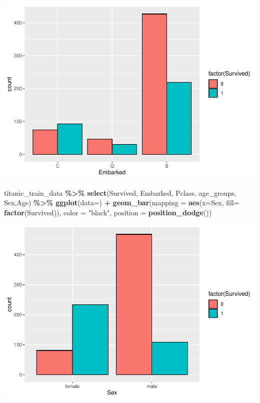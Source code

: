 \documentclass[
]{article}
\newenvironment{Shaded}{\begin{snugshade}}{\end{snugshade}}
\newcommand{\AttributeTok}[1]{\textcolor[rgb]{0.13,0.29,0.53}{#1}}
\newcommand{\FunctionTok}[1]{\textcolor[rgb]{0.13,0.29,0.53}{\textbf{#1}}}
\newcommand{\NormalTok}[1]{#1}
\newcommand{\SpecialCharTok}[1]{\textcolor[rgb]{0.81,0.36,0.00}{\textbf{#1}}}
\newcommand{\StringTok}[1]{\textcolor[rgb]{0.31,0.60,0.02}{#1}}
\begin{document}
\includegraphics{Titanic-Documentation_files/figure-latex/unnamed-chunk-29-1.pdf}

\begin{Shaded}
\begin{Highlighting}[]
\NormalTok{titanic\_train\_data }\SpecialCharTok{\%\textgreater{}\%}
  \FunctionTok{select}\NormalTok{(Survived, Embarked, Pclass, age\_groups, Sex,Age) }\SpecialCharTok{\%\textgreater{}\%}
  \FunctionTok{ggplot}\NormalTok{(}\AttributeTok{data=}\NormalTok{) }\SpecialCharTok{+} 
  \FunctionTok{geom\_bar}\NormalTok{(}\AttributeTok{mapping =}  \FunctionTok{aes}\NormalTok{(}\AttributeTok{x=}\NormalTok{Sex, }\AttributeTok{fill=} \FunctionTok{factor}\NormalTok{(Survived)), }\AttributeTok{color =} \StringTok{"black"}\NormalTok{, }\AttributeTok{position =} \FunctionTok{position\_dodge}\NormalTok{())}
\end{Highlighting}
\end{Shaded}

\includegraphics{Titanic-Documentation_files/figure-latex/unnamed-chunk-30-1.pdf}
\end{document}
